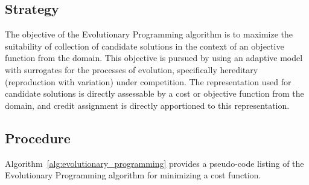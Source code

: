 \subsection{Strategy}
The objective of the Evolutionary Programming algorithm is to maximize the suitability of collection of candidate solutions in the context of an objective function from the domain.
This objective is pursued by using an adaptive model with surrogates for the processes of evolution, specifically hereditary (reproduction with variation) under competition. The representation used for candidate solutions is directly assessable by a cost or objective function from the domain, and credit assignment is directly apportioned to this representation. 

\subsection{Procedure}
Algorithm~\ref{alg:evolutionary_programming} provides a pseudo-code listing of the Evolutionary Programming algorithm for minimizing a cost function. 

